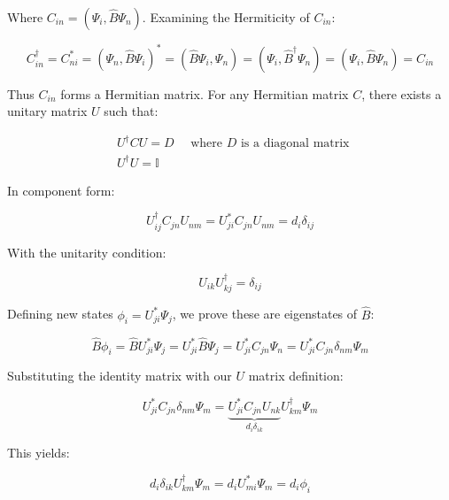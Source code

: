 \documentclass[italian]{HKNdocument}
\begin{document}
Where $C_{i n}=\left(\Psi_{i}, \hat{B} \Psi_{n}\right)$. Examining the Hermiticity of $C_{in}$:

\begin{equation*}
C_{i n}^{\dagger}=C_{n i}^{*}=\left(\Psi_{n}, \hat{B} \Psi_{i}\right)^{*}=\left(\hat{B} \Psi_{i}, \Psi_{n}\right)=\left(\Psi_{i}, \hat{B}^{\dagger} \Psi_{n}\right)=\left(\Psi_{i}, \hat{B} \Psi_{n}\right)=C_{i n} \tag{7.28}
\end{equation*}

Thus $C_{i n}$ forms a Hermitian matrix. For any Hermitian matrix $C$, there exists a unitary matrix $U$ such that:

\begin{align*}
& U^{\dagger} C U=D \quad \text { where } D \text { is a diagonal matrix } \\
& U^{\dagger} U=\mathbb{I} \tag{7.29}
\end{align*}

In component form:

\begin{equation*}
U_{i j}^{\dagger} C_{j n} U_{n m}=U_{j i}^{*} C_{j n} U_{n m}=d_{i} \delta_{i j} \tag{7.30}
\end{equation*}

With the unitarity condition:

\begin{equation*}
U_{i k} U_{k j}^{\dagger}=\delta_{i j} \tag{7.31}
\end{equation*}

Defining new states $\phi_{i}=U_{j i}^{*} \Psi_{j}$, we prove these are eigenstates of $\hat{B}$:

\begin{equation*}
\hat{B} \phi_{i}=\hat{B} U_{j i}^{*} \Psi_{j}=U_{j i}^{*} \hat{B} \Psi_{j}=U_{j i}^{*} C_{j n} \Psi_{n}=U_{j i}^{*} C_{j n} \delta_{n m} \Psi_{m} \tag{7.32}
\end{equation*}

Substituting the identity matrix with our $U$ matrix definition:

\begin{equation*}
U_{j i}^{*} C_{j n} \delta_{n m} \Psi_{m}=\underbrace{U_{j i}^{*} C_{j n} U_{n k}}_{d_{i} \delta_{i k}} U_{k m}^{\dagger} \Psi_{m} \tag{7.33}
\end{equation*}

This yields:

\begin{equation*}
d_{i} \delta_{i k} U_{k m}^{\dagger} \Psi_{m}=d_{i} U_{m i}^{*} \Psi_{m}=d_{i} \phi_{i} \tag{7.34}
\end{equation*}
\end{document}

